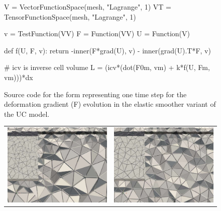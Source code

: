 \begin{figure}
\bwfig
\begin{python}
V = VectorFunctionSpace(mesh, "Lagrange", 1)
VT = TensorFunctionSpace(mesh, "Lagrange", 1)

v = TestFunction(VV)
F = Function(VV)
U = Function(V)

def f(U, F, v):
    return -inner(F*grad(U), v) - inner(grad(U).T*F, v)

# icv is inverse cell volume
L = (icv*(dot(F0m, vm) + k*f(U, Fm, vm)))*dx
\end{python}
\caption{Source code for the form representing one time step for the
deformation gradient (F) evolution in the elastic smoother variant of
the UC model.}
\label{code:FFC_ElasticSmoother}
\end{figure}

\begin{figure}
\bwfig
  \centering
  \begin{tabular}{cc}
    \includegraphics[width=\twofigs]{chapters/hoffman-2/pdf/force_smooth01.pdf} &
    \includegraphics[width=\twofigs]{chapters/hoffman-2/pdf/force_hybrid01.pdf}\\

\end{tabular}
\end{figure}
